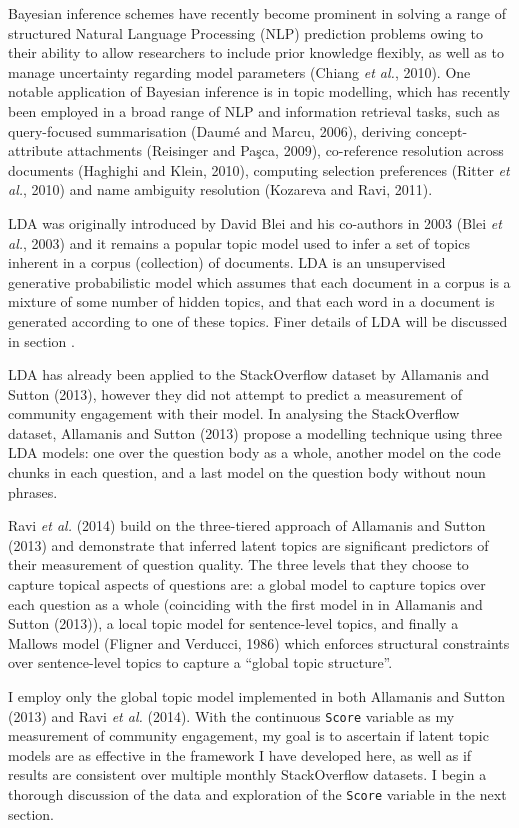 \documentclass[11pt,preprint, authoryear]{article}
\begin{document}
Bayesian inference schemes have recently become prominent in solving a
range of structured Natural Language Processing (NLP) prediction
problems owing to their ability to allow researchers to include prior
knowledge flexibly, as well as to manage uncertainty regarding model
parameters (Chiang \emph{et al.}, 2010). One notable application of
Bayesian inference is in topic modelling, which has recently been
employed in a broad range of NLP and information retrieval tasks, such
as query-focused summarisation (Daumé and Marcu, 2006), deriving
concept-attribute attachments (Reisinger and Paşca, 2009), co-reference
resolution across documents (Haghighi and Klein, 2010), computing
selection preferences (Ritter \emph{et al.}, 2010) and name ambiguity
resolution (Kozareva and Ravi, 2011).

LDA was originally introduced by David Blei and his co-authors in 2003
(Blei \emph{et al.}, 2003) and it remains a popular topic model used to
infer a set of topics inherent in a corpus (collection) of documents.
LDA is an unsupervised generative probabilistic model which assumes that
each document in a corpus is a mixture of some number of hidden topics,
and that each word in a document is generated according to one of these
topics. Finer details of LDA will be discussed in section \label{lda}.

LDA has already been applied to the StackOverflow dataset by Allamanis
and Sutton (2013), however they did not attempt to predict a measurement
of community engagement with their model. In analysing the StackOverflow
dataset, Allamanis and Sutton (2013) propose a modelling technique using
three LDA models: one over the question body as a whole, another model
on the code chunks in each question, and a last model on the question
body without noun phrases.

Ravi \emph{et al.} (2014) build on the three-tiered approach of
Allamanis and Sutton (2013) and demonstrate that inferred latent topics
are significant predictors of their measurement of question quality. The
three levels that they choose to capture topical aspects of questions
are: a global model to capture topics over each question as a whole
(coinciding with the first model in in Allamanis and Sutton (2013)), a
local topic model for sentence-level topics, and finally a Mallows model
(Fligner and Verducci, 1986) which enforces structural constraints over
sentence-level topics to capture a ``global topic structure''.

I employ only the global topic model implemented in both Allamanis and
Sutton (2013) and Ravi \emph{et al.} (2014). With the continuous
\texttt{Score} variable as my measurement of community engagement, my
goal is to ascertain if latent topic models are as effective in the
framework I have developed here, as well as if results are consistent
over multiple monthly StackOverflow datasets. I begin a thorough
discussion of the data and exploration of the \texttt{Score} variable in
the next section.
\end{document}
